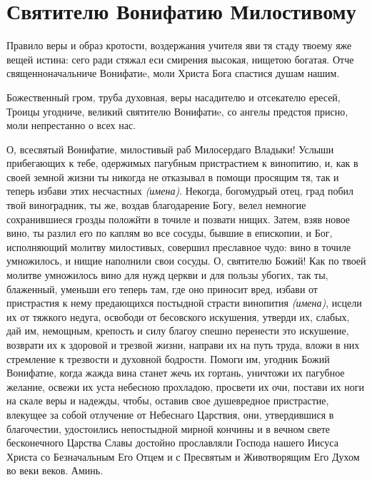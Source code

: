 \vspace{-1.5\baselineskip}\section{Святителю Вонифатию Милостивому}\begin{mymulticols}


Правило веры и образ кротости, воздержания учителя яви тя стаду твоему яже вещей истина: сего ради стяжал еси смирения высокая, нищетою богатая. Отче священноначальниче Вонифатиe, моли Христа Бога спастися душам нашим.


Божественный гром, труба духовная, веры насадителю и отсекателю ересей, Троицы угодниче, великий святителю Вонифатиe, со ангелы предстоя присно,  моли непрестанно о всех нас.


О, всесвятый Вонифатие, милостивый раб Милосердаго Владыки! Услыши прибегающих к тебе, одержимых пагубным пристрастием к винопитию, и, как в своей земной жизни ты никогда не отказывал в помощи просящим тя, так и теперь избави этих несчастных {\itshape(имена)}. Некогда, богомудрый отец, град побил твой виноградник, ты же, воздав благодарение Богу, велел немногие сохранившиеся грозды положйти в точиле и позвати нищих. Затем, взяв новое вино, ты разлил его по каплям во все сосуды, бывшие в епископии, и Бог, исполняющий молитву милостивых, совершил преславное чудо: вино в точиле умножилось, и нищие наполнили свои сосуды. О, святителю Божий! Как по твоей молитве умножилось вино для нужд церкви и для пользы убогих, так ты, блаженный, уменьши его теперь там, где оно приносит вред, избави от пристрастия к нему предающихся постыдной страсти винопития {\itshape(имена)}, исцели их от тяжкого недуга, освободи от бесовского искушения, утверди их, слабых, дай им, немощным, крепость и силу благоу спешно перенести это искушение, возврати их к здоровой и трезвой жизни, направи их на путь труда, вложи в них стремление к трезвости и духовной бодрости. Помоги им, угодник Божий Вонифатие, когда жажда вина станет жечь их гортань, уничтожи их пагубное желание, освежи их уста небесною прохладою, просвети их очи, постави их ноги на скале веры и надежды, чтобы, оставив свое душевредное пристрастие, влекущее за собой отлучение от Небеснаго Царствия, они, утвердившися в благочестии, удостоились непостыдной мирной кончины и в вечном свете бесконечного Царства Славы достойно прославляли Господа нашего Иисуса Христа со Безначальным Его Отцем и с Пресвятым и Животворящим Его Духом во веки веков. Аминь.

\end{mymulticols}

